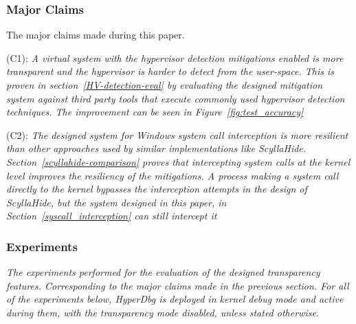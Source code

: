 \subsubsection{Major Claims}
The major claims made during this paper.\\

\begin{compactdesc}

    \item[(C1):] \textit{A virtual system with the hypervisor detection mitigations enabled is more transparent and the hypervisor is harder to detect from the user-space. 
    This is proven in section~\ref{HV-detection-eval} by evaluating the designed mitigation system against third party tools that execute commonly used hypervisor detection techniques. 
    The improvement can be seen in Figure~\ref{fig:test_accuracy}}

    \item[(C2):] \textit{The designed system for Windows system call interception is more resilient than other approaches used by similar implementations like ScyllaHide. Section~\ref{scyllahide-comparison}
    proves that intercepting system calls at the kernel level improves the resiliency of the mitigations. 
    A process making a system call directly to the kernel bypasses the interception attempts in the design of ScyllaHide, but the system designed in this paper, in Section~\ref{syscall_interception} can still intercept it}

\end{compactdesc}

\subsubsection{Experiments}
\textit{The experiments performed for the evaluation of the designed transparency features. Corresponding to the major claims made in the previous section.
For all of the experiments below, HyperDbg is deployed in kernel debug mode and active during them, with the transparency mode disabled, unless stated otherwise.}

